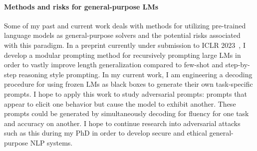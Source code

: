 \documentclass[11pt]{article}
\begin{document}
\paragraph{Methods and risks for general-purpose LMs}

Some of my past and current work 
deals with methods for utilizing pre-trained language models
as general-purpose solvers and the potential risks associated with this paradigm.
In a preprint currently under submission to ICLR 2023~\cite{Khot2022DecomposedPA},
I develop a modular prompting method for recursively prompting large LMs 
in order to vastly improve length generalization 
compared to few-shot and step-by-step reasoning style prompting.
In my current work, I am engineering a
decoding procedure for using frozen LMs as black boxes
to generate their own task-specific prompts.
I hope to apply this work
to study adversarial prompts:
prompts that appear to elicit one behavior 
but cause the model to exhibit another.
These prompts could be generated by simultaneously 
decoding for fluency for one task and accuracy on another.
I hope to continue research into adversarial attacks such as this 
during my PhD in order to
develop secure and ethical general-purpose NLP systems. 
\end{document}
